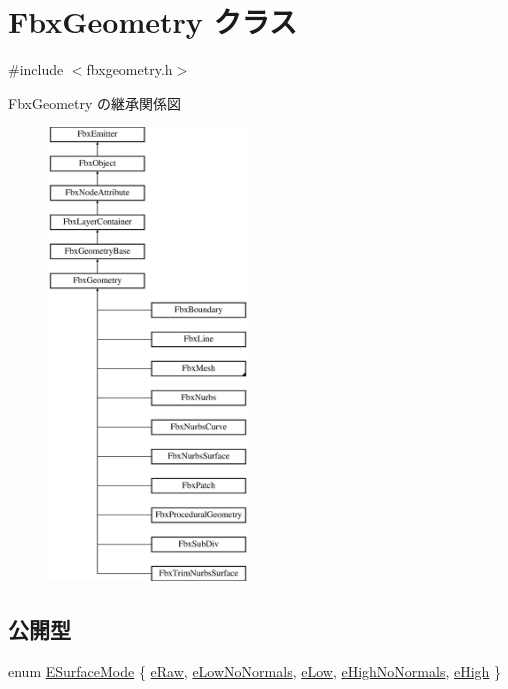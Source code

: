 \hypertarget{class_fbx_geometry}{}\section{Fbx\+Geometry クラス}
\label{class_fbx_geometry}


{\ttfamily \#include $<$fbxgeometry.\+h$>$}

Fbx\+Geometry の継承関係図\begin{figure}[H]
\begin{center}
\leavevmode
\includegraphics[height=12.000000cm]{class_fbx_geometry}
\end{center}
\end{figure}
\subsection*{公開型}
\begin{DoxyCompactItemize}
\item 
enum \hyperlink{class_fbx_geometry_adb9d2e34481a2cb40f1d783c665794db}{E\+Surface\+Mode} \{ \newline
\hyperlink{class_fbx_geometry_adb9d2e34481a2cb40f1d783c665794dbabebe9705fadfcfd4ef100fc493f60412}{e\+Raw}, 
\hyperlink{class_fbx_geometry_adb9d2e34481a2cb40f1d783c665794dba81ece06944d07ab68b5a08a1cb084c55}{e\+Low\+No\+Normals}, 
\hyperlink{class_fbx_geometry_adb9d2e34481a2cb40f1d783c665794dba6da9dccab2d42ec6361050c2deb070a9}{e\+Low}, 
\hyperlink{class_fbx_geometry_adb9d2e34481a2cb40f1d783c665794dbab835bcc45db6e23ee9dc6703614e5300}{e\+High\+No\+Normals}, 
\newline
\hyperlink{class_fbx_geometry_adb9d2e34481a2cb40f1d783c665794dba3f948522e0f01dcacbd6503a3d1e6423}{e\+High}
 \}
\end{DoxyCompactItemize}
